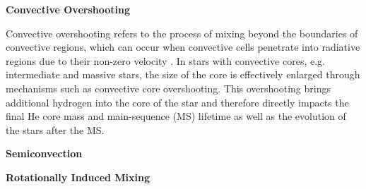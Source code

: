 {\bf Convective Overshooting}

Convective overshooting refers to the process of mixing beyond the boundaries of convective regions, which can occur when convective cells penetrate into radiative regions due to their non-zero velocity \citep{alongi1993evolutionary,brott2011rotating,schootemeijer2019constraining}. In stars with convective cores, e.g. intermediate and massive stars, the size of the core is effectively enlarged through mechanisms such as convective core overshooting. This overshooting brings additional hydrogen into the core of the star and therefore directly impacts the final He core mass and main-sequence (MS) lifetime as well as the evolution of the stars after the MS.

{\bf Semiconvection}

{\bf Rotationally Induced Mixing}
